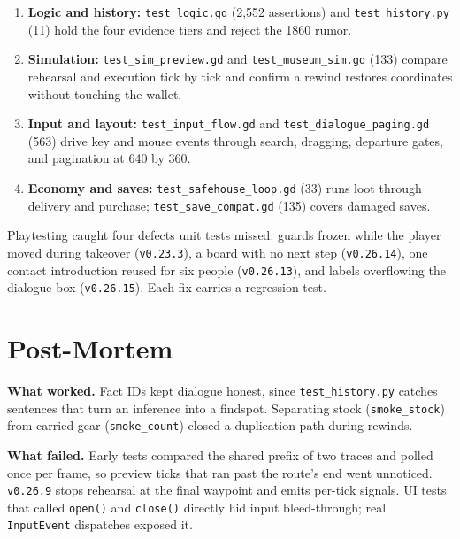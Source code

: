 \documentclass[11pt,a4paper]{article}
\begin{document}
\begin{enumerate}
  \item \textbf{Logic and history:} \texttt{test\_\allowbreak{}logic.gd} (2,552 assertions) and \texttt{test\_\allowbreak{}history.py} (11) hold the four evidence tiers and reject the 1860 rumor.
  \item \textbf{Simulation:} \texttt{test\_\allowbreak{}sim\_\allowbreak{}preview.gd} and \texttt{test\_\allowbreak{}museum\_\allowbreak{}sim.gd} (133) compare rehearsal and execution tick by tick and confirm a rewind restores coordinates without touching the wallet.
  \item \textbf{Input and layout:} \texttt{test\_\allowbreak{}input\_\allowbreak{}flow.gd} and \texttt{test\_\allowbreak{}dialogue\_\allowbreak{}paging.gd} (563) drive key and mouse events through search, dragging, departure gates, and pagination at 640 by 360.
  \item \textbf{Economy and saves:} \texttt{test\_\allowbreak{}safehouse\_\allowbreak{}loop.gd} (33) runs loot through delivery and purchase; \texttt{test\_\allowbreak{}save\_\allowbreak{}compat.gd} (135) covers damaged saves.
\end{enumerate}

Playtesting caught four defects unit tests missed: guards frozen while the player moved during takeover (\texttt{v0.23.3}), a board with no next step (\texttt{v0.26.14}), one contact introduction reused for six people (\texttt{v0.26.13}), and labels overflowing the dialogue box (\texttt{v0.26.15}). Each fix carries a regression test.

\section{Post-Mortem}
\textbf{What worked.} Fact IDs kept dialogue honest, since \texttt{test\_\allowbreak{}history.py} catches sentences that turn an inference into a findspot. Separating stock (\texttt{smoke\_\allowbreak{}stock}) from carried gear (\texttt{smoke\_\allowbreak{}count}) closed a duplication path during rewinds.

\textbf{What failed.} Early tests compared the shared prefix of two traces and polled once per frame, so preview ticks that ran past the route's end went unnoticed. \texttt{v0.26.9} stops rehearsal at the final waypoint and emits per-tick signals. UI tests that called \texttt{open()} and \texttt{close()} directly hid input bleed-through; real \texttt{InputEvent} dispatches exposed it.
\end{document}
